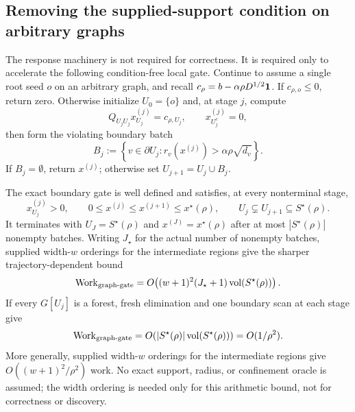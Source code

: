 \subsection{Removing the supplied-support condition on arbitrary graphs}
\label{subsec:condition-free-graph}

The response machinery is not required for correctness.  It is required only
to accelerate the following condition-free local gate.  Continue to assume a
single root seed $o$ on an arbitrary graph, and recall
$c_\rho=b-\alpha\rho D^{1/2}\mathbf{1}$.
If $c_{\rho,o}\leq0$, return zero.  Otherwise initialize $U_0=\{o\}$ and, at
stage $j$, compute
\begin{equation}
 Q_{U_jU_j}x^{(j)}_{U_j}=c_{\rho,U_j},
 \qquad x^{(j)}_{U_j^c}=0,
 \label{eq:exact-tree-gate-solve}
\end{equation}
then form the violating boundary batch
\begin{equation}
 B_j
 :=\left\{
  v\in\partial U_j:
  r_v(x^{(j)})>\alpha\rho\sqrt{d_v}
 \right\}.
 \label{eq:exact-tree-gate-batch}
\end{equation}
If $B_j=\emptyset$, return $x^{(j)}$; otherwise set
$U_{j+1}=U_j\cup B_j$.

\begin{theorem}
\label{thm:condition-free-graph}
The exact boundary gate is well defined and satisfies, at every nonterminal
stage,
\begin{equation}
 x^{(j)}_{U_j}>0,
 \qquad
 0\leq x^{(j)}\leq x^{(j+1)}\leq x^\star(\rho),
 \qquad
 U_j\subsetneq U_{j+1}\subseteq S^\star(\rho).
 \label{eq:graph-gate-monotonicity}
\end{equation}
It terminates with $U_J=S^\star(\rho)$ and
$x^{(J)}=x^\star(\rho)$ after at most $|S^\star(\rho)|$ nonempty batches.
Writing $J_\star$ for the actual number of nonempty batches, supplied
width-$w$ orderings for the intermediate regions give the sharper
trajectory-dependent bound
\begin{equation}
 \operatorname{Work}_{\rm graph\text{-}gate}
 =O\!\left(
  (w+1)^2(J_\star+1)\operatorname{vol}(S^\star(\rho))
 \right).
 \label{eq:graph-gate-batch-work}
\end{equation}
If every $G[U_j]$ is a forest, fresh elimination and one boundary scan at each
stage give
\begin{equation}
 \operatorname{Work}_{\rm graph\text{-}gate}
 =O\!\left(
  |S^\star(\rho)|\operatorname{vol}(S^\star(\rho))
 \right)
 =O(1/\rho^2).
 \label{eq:graph-gate-work}
\end{equation}
More generally, supplied width-$w$ orderings for the intermediate regions give
$O((w+1)^2/\rho^2)$ work.  No exact support, radius, or confinement oracle is
assumed; the width ordering is needed only for this arithmetic bound, not for
correctness or discovery.
\end{theorem}

